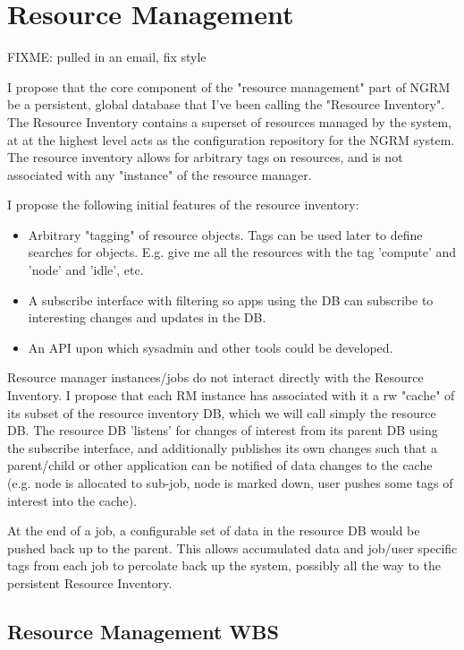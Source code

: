 \section{Resource Management}

FIXME: pulled in an email, fix style

I propose that the core component of the "resource management"
part of NGRM be a persistent, global database that I've been
calling the "Resource Inventory". The Resource Inventory contains
a superset of resources managed by the system, at at the highest
level acts as the configuration repository for the NGRM system.
The resource inventory allows for arbitrary tags on resources,
and is not associated with any "instance" of the resource
manager.

I propose the following initial features of the resource inventory:

\begin{itemize}
\item{Arbitrary "tagging" of resource objects. Tags can be used later
   to define searches for objects. E.g. give me all the resources
   with the tag 'compute' and 'node' and 'idle', etc.}

\item{A subscribe interface with filtering so apps using the DB can
   subscribe to interesting changes and updates in the DB.}

\item{An API upon which sysadmin and other tools could be developed.}
\end{itemize}

Resource manager instances/jobs do not interact directly with
the Resource Inventory. I propose that each RM instance has associated
with it a rw "cache" of its subset of the resource inventory DB,
which we will call simply the resource DB. The resource DB
'listens' for changes of interest from its parent DB using
the subscribe interface, and additionally publishes its own
changes such that a parent/child or other application can
be notified of data changes to the cache (e.g. node is allocated
to sub-job, node is marked down, user pushes some tags of
interest into the cache).

At the end of a job, a configurable set of data in the
resource DB would be pushed back up to the parent. This
allows accumulated data and job/user specific tags from
each job to percolate back up the system, possibly all
the way to the persistent Resource Inventory.

\newpage
\subsection{Resource Management WBS}

